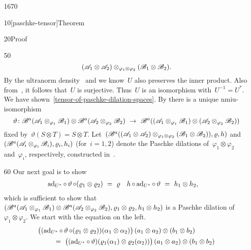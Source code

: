 \begin{parsec}{1670}
\begin{point}{10}[paschke-tensor]{Theorem}
\begin{point}{20}{Proof}
\begin{point}{50}
\begin{equation*}
        (\mathscr{A}_1 \otimes \mathscr{A}_2) \otimes_{\varphi_1 \otimes \varphi_2} (\mathscr{B}_1 \otimes \mathscr{B}_2).
\end{equation*}
    By the ultranorm density~
    and 
    we know~$U$ also preserves the inner product.
    Also from~,
        it follows that~$U$ is surjective.
Thus~$U$ is an isomorphism with~$U^{-1} = U^*$.
    We have shown~\eqref{tensor-of-paschke-dilation-spaces}.
By 
there is a unique nmiu-isomorphism
\begin{equation*}
    \vartheta\colon
    \scrB^a (\scrA_1 \otimes_{\varphi_1} \scrB_1) \otimes
     \scrB^a(\scrA_2 \otimes_{\varphi_2} \scrB_2) \ \to\ 
    \scrB^a
     ((\scrA_1 \otimes_{\varphi_1} \scrB_1) \otimes
     (\scrA_2 \otimes_{\varphi_2} \scrB_2))
\end{equation*}
    fixed by~$\vartheta(S \otimes T) = S \otimes T$.
Let~$(\mathscr{B}^a((\mathscr{A}_1 \otimes \mathscr{A}_2) \otimes_{\varphi_1 \otimes \varphi_2} 
        (\mathscr{B}_1 \otimes \mathscr{B}_2)), \varrho, h)$
        and~$(\mathscr{B}^a(\mathscr{A}_i \otimes_{\varphi_i} \mathscr{B}_i), \varrho_i, h_i)$
    (for~$i=1,2$)
    denote the Paschke dilations
    of~$\varphi_1 \otimes \varphi_2$  and~$\varphi_i$, respectively,
    constructed in~\sref{existence-paschke}.
\end{point}%
\begin{point}{60}%
    Our next goal is to show
    \begin{align}\label{tensorpaschkesecondgoal}
    \mathrm{ad}_{U^*} \mathop{\circ} \vartheta
                \mathop{\circ} (\varrho_1 \otimes \varrho_2) &\ =\  \varrho
                & h \mathop{\circ} \mathrm{ad}_{U^*} \mathop{\circ} \vartheta 
                       & \ =\  h_1 \otimes h_2,
    \end{align}
    which is sufficient to show that~$(
        \mathscr{B}^a(\mathscr{A}_1 \otimes_{\varphi_1} \mathscr{B}_1)
        \otimes \mathscr{B}^a(\mathscr{A}_2 \otimes_{\varphi_2} \mathscr{B}_2),
        \varrho_1 \otimes \varrho_2,
        h_1 \otimes h_2)$
    is a Paschke dilation of~$\varphi_1 \otimes \varphi_2$.
    We start with the equation on the left.
\begin{align*}
    &\bigl((\ad_{U^*} \after \vartheta \after  (\varrho_1 \otimes \varrho_2)) (\alpha_1 \otimes \alpha_2)\bigr)
    \, (a_1 \otimes a_2) \otimes (b_1 \otimes b_2) \\
    &\qquad \ = \ 
    \bigl((\ad_{U^*} \after \vartheta) (\varrho_1 (\alpha_1)\otimes \varrho_2(\alpha_2)) \bigr)
    \, (a_1 \otimes a_2) \otimes (b_1 \otimes b_2) \\

\end{align*}
\end{point}
\end{point}
\end{point}
\end{parsec}
